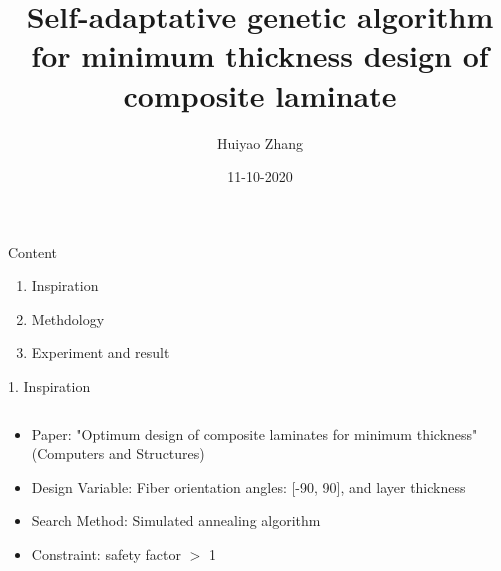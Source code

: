 \documentclass{beamer}
\title{Self-adaptative genetic algorithm for minimum thickness design of composite laminate}
\author{Huiyao Zhang}
\institute{Kyoto Institue of Technology}
\date{11-10-2020}
\begin{document}
\begin{frame}
    \titlepage
\end{frame}



\begin{frame}[c]{Content} 
    \begin{enumerate}
        \item Inspiration
        \item Methdology
        \item Experiment and result
    \end{enumerate}
\end{frame}

\begin{frame}{1. Inspiration}
\begin{columns}[c]
    \begin{column}{0.9\textwidth}
        \begin{itemize}
			\item Paper: "Optimum design of composite laminates for minimum thickness"(Computers and
				Structures)
			\item Design Variable: Fiber orientation angles: [-90, 90], and layer thickness
			\item Search Method: Simulated annealing algorithm
			\item Constraint: safety factor $>$ 1
        \end{itemize}
    \end{column}
\end{columns}

\end{frame}
\end{document}
